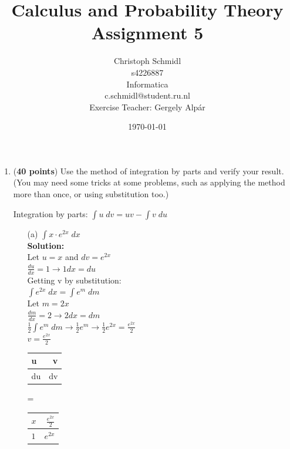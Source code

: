 \documentclass[a4paper]{article}
\title{Calculus and Probability Theory\\ Assignment 5}
\author{Christoph Schmidl\\
s4226887\\
Informatica\\
c.schmidl@student.ru.nl\\
Exercise Teacher: Gergely Alp\'{a}r}
\date{\today}
\begin{document}
\maketitle

\begin{enumerate}

\item (\textbf{40 points}) Use the method of integration by parts and verify your result. (You may need some tricks at some problems, such as applying the method more than once, or using substitution too.)

Integration by parts: $\int u \; dv = uv - \int v \; du$



\begin{enumerate}
	\item[(a)] $\int x \cdot e^{2x} \; dx$\\
	\textbf{Solution:}\\
	
	
Let $u = x$ and $dv = e^{2x}$\\
$\frac{du}{dx} = 1 \rightarrow 1dx = du$\\	

Getting v by substitution:\\

$\int e^{2x} \; dx = \int e^m \; dm$\\
Let $m = 2x$\\

$\frac{dm}{dx} = 2 \rightarrow 2dx = dm$\\

$\frac{1}{2} \int e^m \; dm \rightarrow \frac{1}{2} e^m \rightarrow \frac{1}{2}e^{2x} = \frac{e^{2x}}{2}$\\
$v = \frac{e^{2x}}{2}$\\

\renewcommand{\arraystretch}{2}

\begin{center}
 \begin{tabular}{ l | r }
    \hline
    u & v \\ \hline 
    du & dv \\
    \hline
  \end{tabular}
  = 
 \begin{tabular}{ l | r }
    \hline
    $x$ & $\frac{e^{2x}}{2}$ \\ \hline 
    $1$ & $e^{2x}$ \\
    \hline
  \end{tabular}


\end{center}
\end{enumerate}
\end{enumerate}
\end{document}
